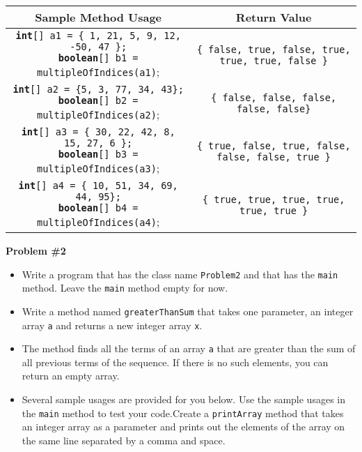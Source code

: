 \documentclass[12pt]{article}
\begin{document}
	\begin{center}
		\small
		\begin{tabular}{| c | c |}
			\hline\rule{0pt}{4ex}
			Sample Method Usage & Return Value \\
			\hline\rule{0pt}{5ex}
			\makecell[l]{\texttt{\textbf{int}[] a1 = \{ 1, 21, 5, 9, 12, -50, 47 \};} \\ \texttt{\textbf{boolean}[] b1 = multipleOfIndices(a1)};} & \texttt{\{ false, true, false, true, true, true, false \}}\\
			\hline\rule{0pt}{5ex}
			\makecell[l]{\texttt{\textbf{int}[] a2 = \{5, 3, 77, 34, 43\};} \\ \texttt{\textbf{boolean}[] b2 = multipleOfIndices(a2)};} & \texttt{\{ false, false, false, false, false\}}\\
			\hline\rule{0pt}{5ex}
			\makecell[l]{\texttt{\textbf{int}[] a3 = \{ 30, 22, 42, 8, 15, 27, 6 \};} \\ \texttt{\textbf{boolean}[] b3 = multipleOfIndices(a3)};} & \texttt{\{ true, false, true, false, false, false, true \}}\\
			\hline\rule{0pt}{5ex}
			\makecell[l]{\texttt{\textbf{int}[] a4 = \{ 10, 51, 34, 69, 44, 95\};} \\ \texttt{\textbf{boolean}[] b4 = multipleOfIndices(a4)};} & \texttt{\{ true, true, true, true, true, true \}}\\
			\hline
		\end{tabular}
	\end{center}
	\vspace*{0.5cm}
	\noindent\textbf{Problem \#2}
	\begin{itemize}
		\item Write a program that has the class name \texttt{Problem2} and that has the \texttt{main} method. Leave the \texttt{main} method empty for now.
		\item Write a method named \texttt{greaterThanSum} that takes one parameter, an integer array \texttt{a} and returns a new integer array \texttt{x}.
		\item  The method finds all the terms of an array \texttt{a} that are greater than the sum of all previous terms of the sequence. If there is no such elements, you can return an empty array.
		\item Several sample usages are provided for you below. Use the sample usages in the \texttt{main} method to test your code.Create a \texttt{printArray} method that takes an integer array as a parameter and prints out the elements of the array on the same line separated by a comma and space.
	\end{itemize}
\end{document}
